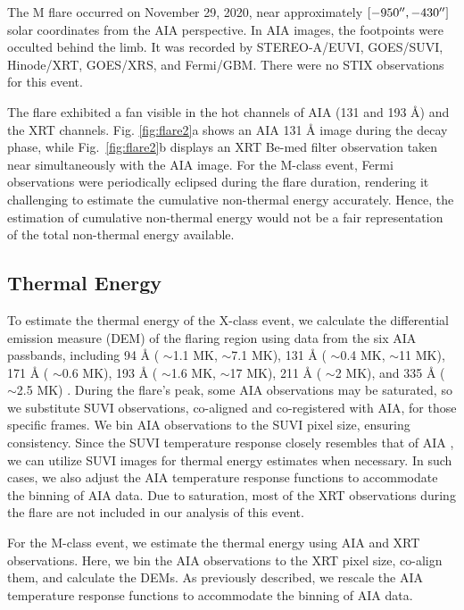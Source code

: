 The M flare occurred on November 29, 2020, near approximately $[-950\hbox{$^{\prime\prime}$},-430\hbox{$^{\prime\prime}$}]$ solar coordinates from the AIA perspective. In AIA images, the footpoints were occulted behind the limb. It was recorded by STEREO-A/EUVI, GOES/SUVI, Hinode/XRT, GOES/XRS, and Fermi/GBM. There were no STIX observations for this event.

The flare exhibited a fan visible in the hot channels of AIA (131 and 193 Å) and the XRT channels. Fig. \ref{fig:flare2}a shows an AIA 131 Å image during the decay phase, while Fig.~\ref{fig:flare2}b displays an XRT Be-med filter observation taken near simultaneously with the AIA image. For the M-class event, Fermi observations were periodically eclipsed during the flare duration, rendering it challenging to estimate the cumulative non-thermal energy accurately. Hence, the estimation of cumulative non-thermal energy would not be a fair representation of the total non-thermal energy available.

\subsection{Thermal Energy}\label{sec:therm}

To estimate the thermal energy of the X-class event, we calculate the differential emission measure (DEM) of the flaring region using data from the six AIA passbands, including 94 Å ( $\sim$1.1 MK,  $\sim$7.1 MK), 131 Å ( $\sim$0.4 MK,  $\sim$11 MK), 171 Å ( $\sim$0.6 MK), 193 Å ( $\sim$1.6 MK,  $\sim$17 MK), 211 Å ( $\sim$2 MK), and 335 Å ( $\sim$2.5 MK) \citep{o'dwyer10,O'Dwyer12}. During the flare's peak, some AIA observations may be saturated, so we substitute SUVI observations, co-aligned and co-registered with AIA, for those specific frames. We bin AIA observations to the SUVI pixel size, ensuring consistency. Since the SUVI temperature response closely resembles that of AIA \citep{suvi}, we can utilize SUVI images for thermal energy estimates when necessary. In such cases, we also adjust the AIA temperature response functions to accommodate the binning of AIA data. Due to saturation, most of the XRT observations during the flare are not included in our analysis of this event.

For the M-class event, we estimate the thermal energy using AIA and XRT observations. Here, we bin the AIA observations to the XRT pixel size, co-align them, and calculate the DEMs. As previously described, we rescale the AIA temperature response functions to accommodate the binning of AIA data.

